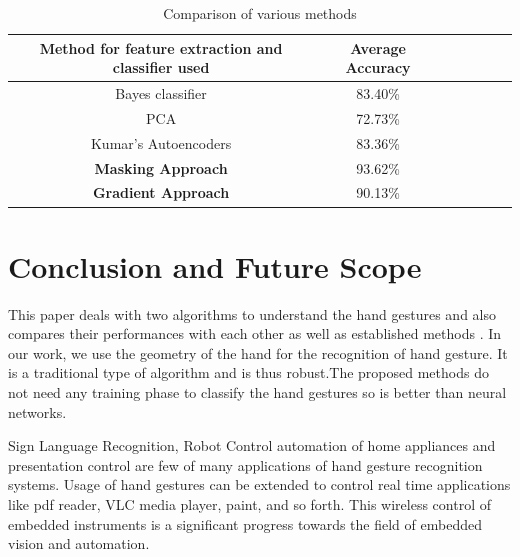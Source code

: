 \documentclass[conference]{IEEEtran}
\begin{document}
\begin{table}[h!]
\caption{Comparison of various methods}
\begin{center}
\begin{tabular}{|c|c|c|c|c|c|c|}
\hline
Method for feature extraction and classifier used & Average Accuracy \\ \hline
Bayes classifier \cite{Avraam2014StaticGR} & 83.40\% \\ \hline
PCA & 72.73\% \\ \hline
Kumar's Autoencoders \cite{kumar2014static} & 83.36\% \\ \hline
\textbf{Masking Approach} & 93.62\% \\ \hline
\textbf{Gradient Approach} & 90.13\% \\ \hline
\end{tabular}
\end{center}
\end{table}


\section{Conclusion and Future Scope}
This paper deals with two algorithms to understand the hand gestures and also compares their performances with each other as well as established methods \cite{khan2012hand}. In our work, we use the geometry of the hand for the recognition of hand gesture. It is a traditional type of algorithm and is thus robust.The proposed methods do not need any training phase \cite{7813732} to classify the hand gestures so is better than neural networks.

Sign Language Recognition, Robot Control automation of home appliances and presentation control are few of many applications of hand gesture recognition systems. Usage of hand gestures can be extended to control real time applications like pdf reader, VLC media player, paint, and so forth. This wireless control of embedded instruments is a significant progress towards the field of embedded vision and automation.




\end{document}
